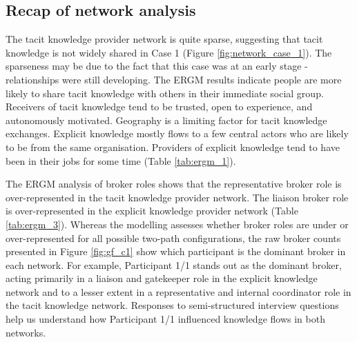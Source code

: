 \subsection{Recap of network analysis}

The tacit knowledge provider network is quite sparse, suggesting that tacit knowledge is not widely shared in Case 1 (Figure \ref{fig:network_case_1}). The sparseness may be due to the fact that this case was at an early stage - relationships were still developing. The ERGM results indicate people are more likely to share tacit knowledge with others in their immediate social group. Receivers of tacit knowledge tend to be trusted, open to experience, and autonomously motivated. Geography is a limiting factor for tacit knowledge exchanges. Explicit knowledge mostly flows to a few central actors who are likely to be from the same organisation. Providers of explicit knowledge tend to have been in their jobs for some time (Table \ref{tab:ergm_1}). \medskip

The ERGM analysis of broker roles shows that the representative broker role is over-represented in the tacit knowledge provider network. The liaison broker role is over-represented in the explicit knowledge provider network (Table \ref{tab:ergm_3}). Whereas the modelling assesses whether broker roles are under or over-represented for all possible two-path configurations, the raw broker counts presented in Figure \ref{fig:gf_c1} show which participant is the dominant broker in each network. For example, Participant 1/1 stands out as the dominant broker, acting primarily in a liaison and gatekeeper role in the explicit knowledge network and to a lesser extent in a representative and internal coordinator role in the tacit knowledge network. Responses to semi-structured interview questions help us understand how Participant 1/1 influenced knowledge flows in both networks.  

